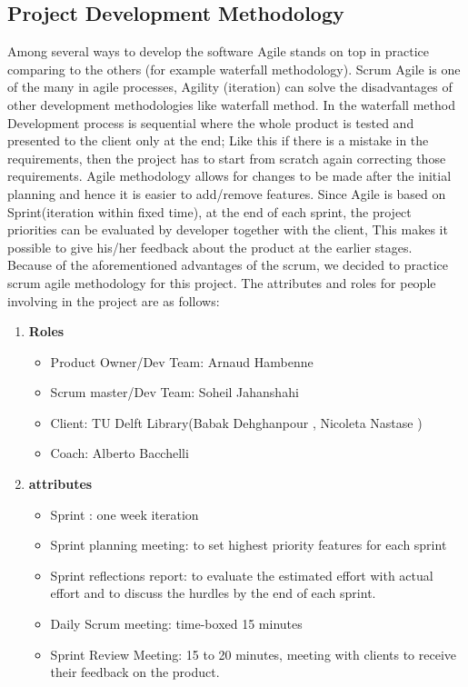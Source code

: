 \subsection{Project Development Methodology} %
Among several ways to develop the software Agile stands on top in practice comparing to the others (for example waterfall methodology). Scrum Agile is one of the many in agile processes, Agility (iteration) can solve the disadvantages of other development methodologies like waterfall method. In the waterfall method Development process is sequential where the whole product is tested and presented to the client only at the end; Like this if there is a mistake in the requirements, then the project has to start from scratch again correcting those requirements. Agile methodology allows for changes to be made after the initial planning and hence it is easier to add/remove features. Since Agile is based on Sprint(iteration within fixed time), at the end of each sprint, the project priorities can be evaluated by developer together with the client, This makes it possible to give his/her feedback about the product at the earlier stages.\\
Because of the aforementioned advantages of the scrum, we decided to practice scrum agile methodology for this project. The attributes and roles for people involving in the project are as follows:

\begin{enumerate}
	\item \textbf{Roles}
		\begin{itemize}
			
			\item Product Owner/Dev Team: Arnaud Hambenne
			\item Scrum master/Dev Team: Soheil Jahanshahi
			\item Client: TU Delft Library(Babak Dehghanpour , Nicoleta Nastase )
			\item Coach: Alberto Bacchelli
		\end{itemize}
	\item \textbf{attributes}	
\begin{itemize}
		\item Sprint : one week iteration
		\item Sprint planning meeting: to set highest priority features for each sprint 
		\item Sprint reflections report: to evaluate the estimated effort with actual effort and to discuss the hurdles by the end of each sprint.
		\item Daily Scrum meeting: time-boxed 15 minutes
		\item Sprint Review Meeting: 15 to 20 minutes, meeting with clients to receive their feedback on the product.
		
\end{itemize} 
\end{enumerate}
